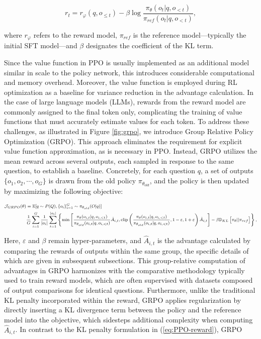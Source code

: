 \begin{equation}
    r_{t} = r_\varphi(q, o_{\le t}) - \beta \log\frac{\pi_{\theta}(o_{t}|q, o_{<t})}{\pi_{ref}(o_{t}|q, o_{<t})},
\label{eq:PPO-reward}
\end{equation}

where $r_\varphi$ refers to the reward model, $\pi_{ref}$ is the reference model—typically the initial SFT model—and $\beta$ designates the coefficient of the KL term.

Since the value function in PPO is usually implemented as an additional model similar in scale to the policy network, this introduces considerable computational and memory overhead. Moreover, the value function is employed during RL optimization as a baseline for variance reduction in the advantage calculation. In the case of large language models (LLMs), rewards from the reward model are commonly assigned to the final token only, complicating the training of value functions that must accurately estimate values for each token. To address these challenges, as illustrated in Figure \ref{fig:grpo}, we introduce Group Relative Policy Optimization (GRPO). This approach eliminates the requirement for explicit value function approximation, as is necessary in PPO. Instead, GRPO utilizes the mean reward across several outputs, each sampled in response to the same question, to establish a baseline. Concretely, for each question $q$, a set of outputs $\{o_1, o_2, \cdots, o_G\}$ is drawn from the old policy $\pi_{\theta_{old}}$, and the policy is then updated by maximizing the following objective:

\begin{equation}
\footnotesize
\begin{split}
    \mathcal{J}_{GRPO}(\theta) &= \mathbb{E}{[q \sim P(Q), \{o_i\}_{i=1}^G \sim \pi_{\theta_{old}}(O|q)]}  \\
    & \frac{1}{G}\sum_{i=1}^G\frac{1}{|o_i|} \sum_{t=1}^{|o_i|} \left\{ \min \left[ \frac{\pi_\theta(o_{i,t} | q, o_{i,<t})}{\pi_{\theta_{old}}(o_{i,t} | q, o_{i,<t})} \hat{A}_{i,t}, \text{clip} \left( \frac{\pi_\theta(o_{i,t} | q, o_{i,<t})}{\pi_{\theta_{old}}(o_{i,t} | q, o_{i,<t})}, 1 - \varepsilon, 1 + \varepsilon \right)  \hat{A}_{i,t} \right] - \beta \mathbb{D}_{KL}\left[\pi_{\theta} || \pi_{ref}\right]\right\} ,
\end{split}
\label{eq:GRPO-obj}
\end{equation}

Here, $\varepsilon$ and $\beta$ remain hyper-parameters, and $\hat{A}_{i,t}$ is the advantage calculated by comparing the rewards of outputs within the same group, the specific details of which are given in subsequent subsections. This group-relative computation of advantages in GRPO harmonizes with the comparative methodology typically used to train reward models, which are often supervised with datasets composed of output comparisons for identical questions. Furthermore, unlike the traditional KL penalty incorporated within the reward, GRPO applies regularization by directly inserting a KL divergence term between the policy and the reference model into the objective, which sidesteps additional complexity when computing $\hat{A}_{i,t}$. In contrast to the KL penalty formulation in (\ref{eq:PPO-reward}), GRPO

